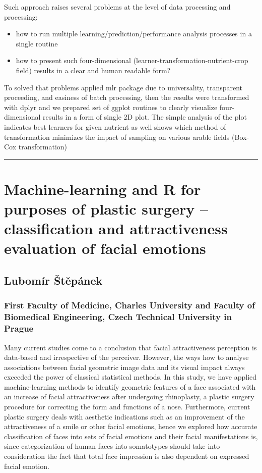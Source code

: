 \documentclass [12pt]{article}
\begin{document}
Such approach raises several problems at the level of data processing and processing:
\begin{itemize}
\setlength\itemsep{.15em}
\item how to run multiple learning/prediction/performance analysis processes in a single routine
\item how to present such four-dimensional (learner-transformation-nutrient-crop field) results in a clear and human readable form?
\end{itemize}

To solved that problems applied mlr package due to universality, transparent proceeding, and easiness of batch processing, then the results were transformed with dplyr and we prepared set of ggplot routines to clearly visualize four-dimensional results in a form of single 2D plot. The simple analysis of the plot indicates best learners for given nutrient as well shows which method of transformation minimizes the impact of sampling on various arable fields (Box-Cox transformation)

\noindent\rule{\textwidth}{1pt}
\section{Machine-learning and R for purposes of plastic surgery -- classification and attractiveness evaluation of facial emotions}
\subsection*{Lubomír Štěpánek}
\subsubsection*{First Faculty of Medicine, Charles University and Faculty of Biomedical Engineering, Czech Technical University in Prague}

Many current studies come to a conclusion that facial attractiveness perception is data-based and irrespective of the perceiver. However, the ways how to analyse associations between facial geometric image data and its visual impact always exceeded the power of classical statistical methods. In this study, we have applied machine-learning methods to identify geometric features of a face associated with an increase of facial attractiveness after undergoing rhinoplasty, a plastic surgery procedure for correcting the form and functions of a nose. Furthermore, current plastic surgery deals with aesthetic indications such as an improvement of the attractiveness of a smile or other facial emotions, hence we explored how accurate classification of faces into sets of facial emotions and their facial manifestations is, since categorization of human faces into somatotypes should take into consideration the fact that total face impression is also dependent on expressed facial emotion.
\end{document}
